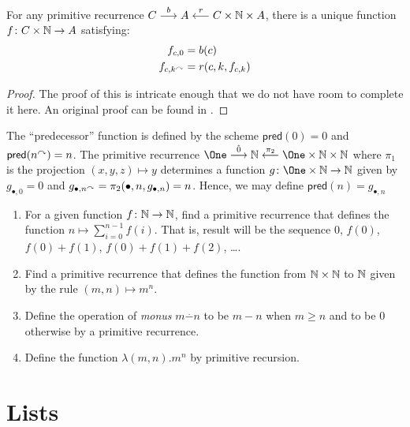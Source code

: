 \begin{lemma}
	For any primitive recurrence $C \stackrel{b}{\longrightarrow} A \stackrel{r}{\longleftarrow} C\times \mathbb N \times A$, there is a unique
	function ${f}\colon{C\times \mathbb N}\to{A}$ satisfying: 
	\begin{align*}
		f_{c,0} &= b(c)\\
		f_{c,k^\curvearrowright} &= r(c,k,f_{c,k})
	\end{align*}

	\begin{proof}
		The proof of this is intricate enough that we do not have room to complete it here. 
		An original proof can be found in \cite{freyd66}.
	\end{proof}
\end{lemma}

\newcommand{\pred}{\mathord{\textsf{pred}}}
\begin{example}
	The ``predecessor'' function is defined by the scheme $\pred(0)=0$ and $\pred(n^\nxt) = n$. 
	The primitive recurrence
	$\One \stackrel{\hat0}{\longrightarrow} \NN \stackrel{\pi_2}{\longleftarrow} \One\times\NN\times\NN$ where $\pi_1$ is the projection $(x,y,z)\mapsto y$ determines a function $\fromto g{\One\times \NN}{\NN}$ given by
	$g_{\bullet, 0} = 0$ and $g_{\bullet,n^\curvearrowright} = \pi_2(\bullet, n, g_{\bullet, n}) = n$. Hence, we may define $\pred(n) = g_{\bullet, n}$
\end{example}



\begin{exercises}
\begin{enumerate}
	\item For a given function ${f}\colon{\mathbb N}\to{\mathbb N}$, find a primitive recurrence that defines the function $n\mapsto \sum_{i=0}^{n-1}f(i)$. That is, result will be the sequence $0$, $f(0)$, $f(0)+f(1)$, $f(0)+f(1)+f(2)$, \ldots.
	\item Find a primitive recurrence that defines the function from $\mathbb N\times \mathbb N$ to $\mathbb N$ given by the rule $(m,n)\mapsto m^n$.
	\item Define the operation of \emph{monus} $m\stackrel{.}{-} n$ to be $m-n$ when $m \geq n$ and to be $0$ otherwise by  a primitive recurrence.
	\item Define the function $\lambda(m,n).m^n$ by primitive recursion.
\end{enumerate}
\end{exercises}

\section{Lists}

